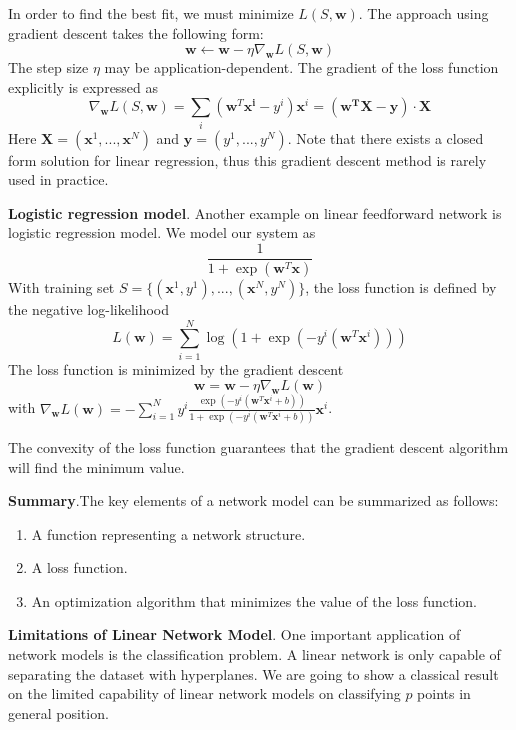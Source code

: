 In order to find the best fit, we must minimize $L(S, \bm w)$. The approach using gradient descent takes the following form:
\begin{equation}
  \bm w \leftarrow \bm w-\eta\nabla_{\bm w}L(S, \bm w)
\end{equation}
The step size $\eta$ may be application-dependent. The gradient of the loss function explicitly is expressed as
\begin{equation}
  \nabla_{\bm w}L(S, \bm w) = \sum_i(\bm w^T\bm{x^i} - y^i)\bm x^i = (\bm{w^TX-y})\cdot\bm X
\end{equation}
Here $\bm X = (\bm x^1,...,\bm x^N)$ and $\bm y=(y^1,...,y^N)$.
Note that there exists a closed form solution for linear regression, thus this gradient descent method is rarely used in practice.

{\bf Logistic regression model}. Another example on linear feedforward network is logistic regression model. We model our system as
\begin{equation}
\frac{1}{1+\exp(\bm w^T \bm x)}
\end{equation}
With training set $S = \{(\bm x^1, y^1), ..., (\bm x^N, y^N)\}$, the loss function is defined by the negative log-likelihood
\begin{equation}
 L(\bm w) = \sum_{i=1}^N\log(1+\exp(-y^i(\bm w^T\bm x^i)))
\end{equation}
The loss function is minimized by the gradient descent
\begin{equation}
  \bm w = \bm w-\eta\nabla_{\bm w}L(\bm w)
\end{equation}
with $\nabla_{\bm w}L(\bm w) = -\sum_{i=1}^N y^i\frac{\exp(-y^i(\bm w^T\bm x^i+b))}{1+\exp(-y^i(\bm w^T\bm x^i+b))}\bm x^i$.

The convexity of the loss function guarantees that the gradient descent algorithm will find the minimum value.

{\bf Summary}.The key elements of a network model can be summarized as follows: 
\begin{enumerate}
    \item A function representing a network structure.
    \item A loss function.
    \item An optimization algorithm that minimizes the value of the loss function.
\end{enumerate}

{\bf Limitations of Linear Network Model}. One important application of network models is the classification problem. A linear network is only capable of separating the dataset with hyperplanes. We are going to show a classical result on the limited capability of linear network models on classifying $p$ points in general position.

